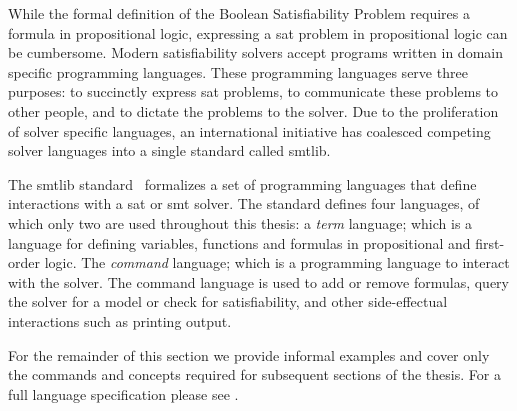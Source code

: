 While the formal definition of the Boolean Satisfiability Problem requires a
formula in propositional logic, expressing a \ac{sat} problem in propositional
logic can be cumbersome. Modern satisfiability solvers accept programs written
in domain specific programming languages. These programming languages serve
three purposes: to succinctly express \ac{sat} problems, to communicate these
problems to other people, and to dictate the problems to the solver. Due to the
proliferation of solver specific languages, an international initiative has
coalesced competing solver languages into a single standard called \acl{smtlib}.

The \acl{smtlib} standard~\cite{BarFT-SMTLIB} formalizes a set of programming
languages that define interactions with a \ac{sat} or \ac{smt} solver. The
standard defines four languages, of which only two are used throughout this
thesis: a \emph{term} language; which is a language for defining variables,
functions and formulas in propositional and first-order logic. The
\emph{command} language; which is a programming language to interact with the
solver. The command language is used to add or remove formulas, query the solver
for a model or check for satisfiability, and other side-effectual interactions
such as printing output.

For the remainder of this section we provide informal examples and cover only
the commands and concepts required for subsequent sections of the thesis. For a
full language specification please see \citet{BarFT-SMTLIB}.

